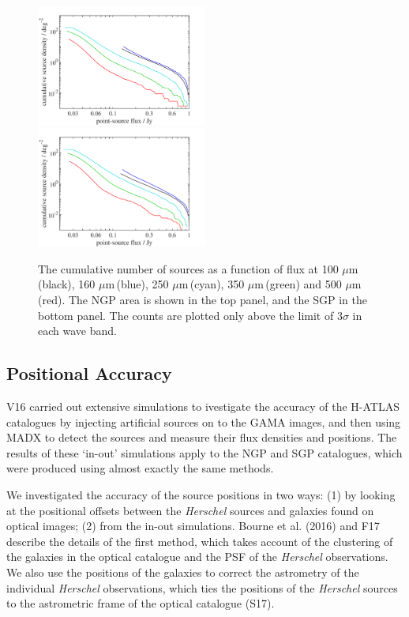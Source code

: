 \documentclass[useAMS,usenatbib]{mnras}
\def\mic{ $\mu $m\,}
\begin{document}
\begin{figure}
\textsl{}  \includegraphics[width=0.5\textwidth]{cum_countsdeg_NGP.pdf}\\
  \includegraphics[width=0.5\textwidth]{cum_countsdeg_SGP.pdf}
  \caption{\protect\label{fig_cum_flux} The cumulative number of
    sources as a function of flux at 100\mic (black), 160\mic (blue),
    250\mic (cyan), 350\mic (green) and 500\mic (red). The NGP area is
    shown in the top panel, and the SGP in the bottom panel. The
    counts are plotted only above the limit of 3$\sigma$ in each wave
    band.  }
\end{figure}

\subsection{Positional Accuracy}

V16 carried out extensive simulations to ivestigate the accuracy of
the H-ATLAS catalogues by injecting artificial sources on to the GAMA
images, and then using MADX to detect the sources and measure their
flux densities and positions. The results of these `in-out'
simulations apply to the NGP and SGP catalogues, which were produced
using almost exactly the same methods.

We investigated the accuracy of the source positions in two ways: (1)
by looking at the positional offsets between the {\it Herschel}
sources and galaxies found on optical images; (2) from the in-out
simulations.  Bourne et al. (2016) and F17 describe the details of the
first method, which takes account of the clustering of the galaxies in
the optical catalogue and the PSF of the {\it Herschel} observations.
We also use the positions of the galaxies to correct the astrometry of
the individual {\it Herschel} observations, which ties the positions
of the {\it Herschel} sources to the astrometric frame of the optical
catalogue (S17).
\end{document}
